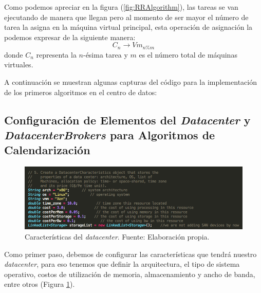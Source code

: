 Como podemos apreciar en la figura (\ref{fig:RRAlgorithm}), las tareas se van ejecutando de manera que llegan pero al momento de ser mayor el número de tarea la asigna en la máquina virtual principal, esta operación de asignación la podemos expresar de la siguiente manera: $$C_n \rightarrow Vm_{n \% m}$$ donde $C_n$ representa la $n$-ésima tarea y $m$ es el número total de máquinas virtuales.

\newpage
A continuaci\'on se muestran algunas capturas del c\'odigo para la implementaci\'on de los primeros algoritmos en el centro de datos:


\subsection*{Configuración de Elementos del \textit{Datacenter} y \textit{DatacenterBrokers} para Algoritmos de Calendarización}

\setcounter{figure}{8}
\renewcommand\thefigure{\arabic{figure}}
\begin{figure}[h!]
	\centering
	\includegraphics[scale=0.5]{media/caracteristicas_datacenter}
	\caption{Características del \textit{datacenter}. Fuente: Elaboración propia.}
	\label{fig:DCar}
\end{figure}


Como primer paso,  debemos de configurar las caracter\'isticas que tendrá nuestro \textit{datacenter}, para eso tenemos que definir la arquitectura, el tipo de sistema operativo, costos de utilizaci\'on de memoria, almacenamiento y ancho de banda, entre otros (Figura \ref{fig:DCar}).

\newpage

